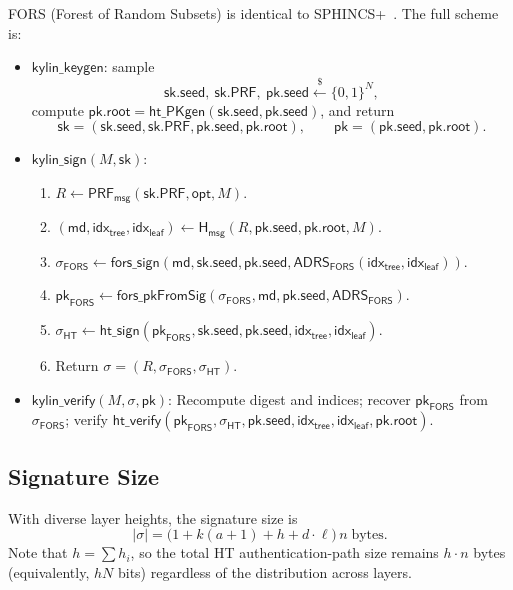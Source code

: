 \documentclass[11pt,a4paper]{article}
\newcommand{\bits}{\{0,1\}}
\newcommand{\pk}{\mathsf{pk}}
\newcommand{\sk}{\mathsf{sk}}
\newcommand{\SK}{\mathsf{sk}}
\newcommand{\PK}{\mathsf{pk}}
\newcommand{\seed}{\mathsf{seed}}
\newcommand{\ADRS}{\mathsf{ADRS}}
\newcommand{\PRFmsg}{\mathsf{PRF}_{\mathsf{msg}}}
\newcommand{\Hmsg}{\mathsf{H}_{\mathsf{msg}}}
\newcommand{\prf}{\mathsf{PRF}}
\newcommand{\Nbits}{N}
\begin{document}
FORS (Forest of Random Subsets) is identical to SPHINCS+~\cite{BHK+19}. The full scheme is:

\begin{itemize}
    \item $\mathsf{kylin\_keygen}$: sample
    \[
    \sk.\seed,\ \sk.\prf,\ \pk.\seed \xleftarrow{\$} \bits^\Nbits,
    \]
    compute $\pk.\mathsf{root}=\mathsf{ht\_PKgen}(\sk.\seed,\pk.\seed)$, and return
    \[
    \SK=(\sk.\seed,\sk.\prf,\pk.\seed,\pk.\mathsf{root}),
    \qquad
    \PK=(\pk.\seed,\pk.\mathsf{root}).
    \]
    \item $\mathsf{kylin\_sign}(M, \SK)$:
    \begin{enumerate}
        \item $R \gets \PRFmsg(\sk.\prf, \mathsf{opt}, M)$.
        \item $(\mathsf{md}, \mathsf{idx}_{\mathsf{tree}}, \mathsf{idx}_{\mathsf{leaf}}) \gets \Hmsg(R, \pk.\seed, \pk.\mathsf{root}, M)$.
        \item $\sigma_{\mathsf{FORS}} \gets \mathsf{fors\_sign}(\mathsf{md}, \sk.\seed, \pk.\seed, \ADRS_{\mathsf{FORS}}(\mathsf{idx}_{\mathsf{tree}}, \mathsf{idx}_{\mathsf{leaf}}))$.
        \item $\pk_{\mathsf{FORS}} \gets \mathsf{fors\_pkFromSig}(\sigma_{\mathsf{FORS}}, \mathsf{md}, \pk.\seed, \ADRS_{\mathsf{FORS}})$.
        \item $\sigma_{\mathsf{HT}} \gets \mathsf{ht\_sign}(\pk_{\mathsf{FORS}}, \sk.\seed, \pk.\seed, \mathsf{idx}_{\mathsf{tree}}, \mathsf{idx}_{\mathsf{leaf}})$.
        \item Return $\sigma = (R, \sigma_{\mathsf{FORS}}, \sigma_{\mathsf{HT}})$.
    \end{enumerate}
    \item $\mathsf{kylin\_verify}(M, \sigma, \PK)$: Recompute digest and indices; recover $\pk_{\mathsf{FORS}}$ from $\sigma_{\mathsf{FORS}}$; verify $\mathsf{ht\_verify}(\pk_{\mathsf{FORS}}, \sigma_{\mathsf{HT}}, \pk.\seed, \mathsf{idx}_{\mathsf{tree}}, \mathsf{idx}_{\mathsf{leaf}}, \pk.\mathsf{root})$.
\end{itemize}

\subsection{Signature Size}

With diverse layer heights, the signature size is
\[
|\sigma| = \bigl(1 + k(a+1) + h + d \cdot \ell\bigr)\, n \;\text{bytes}.
\]
Note that $h = \sum h_i$, so the total HT authentication-path size remains $h \cdot n$ bytes (equivalently, $h\Nbits$ bits) regardless of the distribution across layers.
\end{document}
